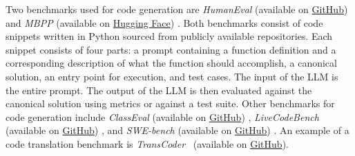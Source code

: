 


Two benchmarks used for code generation are \emph{HumanEval} (available on \href{https://github.com/openai/human-eval}{GitHub}) \cite{DBLP:conf/acl/PapineniRWZ02} and \emph{MBPP} (available on \href{https://huggingface.co/datasets/google-research-datasets/mbpp}{Hugging Face}) \cite{DBLP:journals/corr/abs-2108-07732}.
Both benchmarks consist of code snippets written in Python sourced from publicly available repositories.
Each snippet consists of four parts: a prompt containing a function definition and a corresponding description of what the function should accomplish, a canonical solution, an entry point for execution, and test cases.
The input of the LLM is the entire prompt.
The output of the LLM is then evaluated against the canonical solution using metrics or against a test suite.
Other benchmarks for code generation include \emph{ClassEval} (available on \href{https://github.com/FudanSELab/ClassEval}{GitHub}) \cite{DBLP:journals/corr/abs-2308-01861}, \emph{LiveCodeBench} (available on \href{https://github.com/LiveCodeBench/LiveCodeBench}{GitHub}) \cite{DBLP:journals/corr/abs-2403-07974}, and \emph{SWE-bench} (available on \href{https://github.com/swe-bench/SWE-bench}{GitHub}) \cite{DBLP:conf/iclr/JimenezYWYPPN24}.
An example of a code translation benchmark is \emph{TransCoder}~\cite{DBLP:journals/corr/abs-2006-03511} (available on \href{https://github.com/facebookresearch/CodeGen}{GitHub}). 

